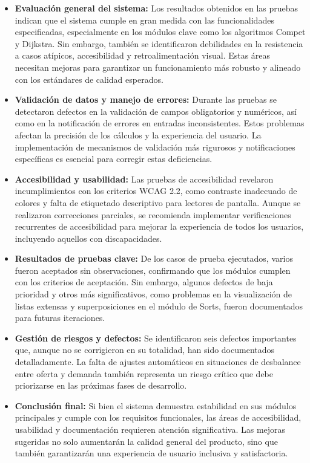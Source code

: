 \documentclass[stu, 12pt, letterpaper, donotrepeattitle, floatsintext, natbib]{apa7}
\begin{document}
\begin{itemize}
    \item \textbf{Evaluaci\'on general del sistema:} Los resultados obtenidos en las pruebas indican que el sistema cumple en gran medida con las funcionalidades especificadas, especialmente en los m\'odulos clave como los algoritmos Compet y Dijkstra. Sin embargo, tambi\'en se identificaron debilidades en la resistencia a casos at\'ipicos, accesibilidad y retroalimentaci\'on visual. Estas \'areas necesitan mejoras para garantizar un funcionamiento m\'as robusto y alineado con los est\'andares de calidad esperados.

    \item \textbf{Validaci\'on de datos y manejo de errores:} Durante las pruebas se detectaron defectos en la validaci\'on de campos obligatorios y num\'ericos, as\'i como en la notificaci\'on de errores en entradas inconsistentes. Estos problemas afectan la precisi\'on de los c\'alculos y la experiencia del usuario. La implementaci\'on de mecanismos de validaci\'on m\'as rigurosos y notificaciones espec\'ificas es esencial para corregir estas deficiencias.

    \item \textbf{Accesibilidad y usabilidad:} Las pruebas de accesibilidad revelaron incumplimientos con los criterios WCAG 2.2, como contraste inadecuado de colores y falta de etiquetado descriptivo para lectores de pantalla. Aunque se realizaron correcciones parciales, se recomienda implementar verificaciones recurrentes de accesibilidad para mejorar la experiencia de todos los usuarios, incluyendo aquellos con discapacidades.

    \item \textbf{Resultados de pruebas clave:} De los casos de prueba ejecutados, varios fueron aceptados sin observaciones, confirmando que los m\'odulos cumplen con los criterios de aceptaci\'on. Sin embargo, algunos defectos de baja prioridad y otros m\'as significativos, como problemas en la visualizaci\'on de listas extensas y superposiciones en el m\'odulo de Sorts, fueron documentados para futuras iteraciones.

    \item \textbf{Gestión de riesgos y defectos:} Se identificaron seis defectos importantes que, aunque no se corrigieron en su totalidad, han sido documentados detalladamente. La falta de ajustes autom\'aticos en situaciones de desbalance entre oferta y demanda tambi\'en representa un riesgo cr\'itico que debe priorizarse en las pr\'oximas fases de desarrollo.

    \item \textbf{Conclusión final:} Si bien el sistema demuestra estabilidad en sus m\'odulos principales y cumple con los requisitos funcionales, las \'areas de accesibilidad, usabilidad y documentaci\'on requieren atenci\'on significativa. Las mejoras sugeridas no solo aumentar\'an la calidad general del producto, sino que tambi\'en garantizar\'an una experiencia de usuario inclusiva y satisfactoria.
\end{itemize}
\end{document}
